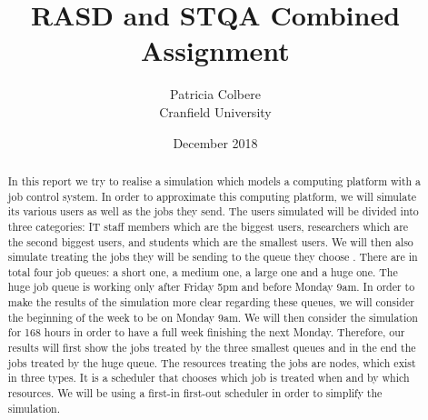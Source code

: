 \documentclass [10 pt, a4 paper]{report}
\title{RASD and STQA Combined Assignment}
\author{Patricia Colbere \\ Cranfield University}
\date{December 2018}
\begin{document}
\maketitle

\tableofcontents

\begin{abstract}
    In this report we try to realise a simulation which models a computing platform with a job control system. In order to approximate this computing platform, we will simulate its various users as well as the jobs they send. The users simulated will be divided into three categories: IT staff members which are the biggest users, researchers which are the second biggest users, and students which are the smallest users. We will then also simulate treating the jobs they will be sending to the queue they choose . There are in total four job queues: a short one, a medium one, a large one and a huge one. The huge job queue is working only after Friday 5pm and before Monday 9am. In order to make the results of the simulation more clear regarding these queues, we will consider the beginning of the week to be on Monday 9am. We will then consider the simulation for 168 hours in order to have a full week finishing the next Monday. Therefore, our results will first show the jobs treated by the three smallest queues and in the end the jobs treated by the huge queue. The resources treating the jobs are nodes, which exist in three types. It is a scheduler that chooses which job is treated when and by which resources. We will be using a first-in first-out scheduler in order to simplify the simulation.
   

\end{abstract}
\end{document}
